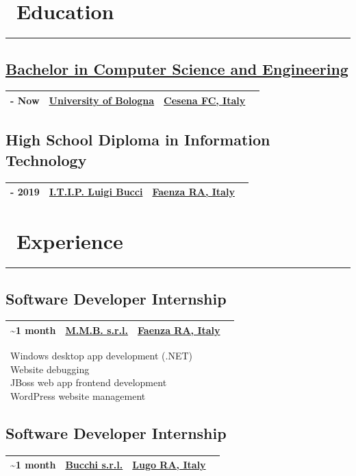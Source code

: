 \documentclass{article}
\newcommand{\event}[3]{
    \begin{tabularx}{\linewidth}{| >{\raggedright\arraybackslash}X >{\centering\arraybackslash}X >{\raggedleft\arraybackslash}X |}
        \hline
        #1 & #2 & #3 \\
        \hline
    \end{tabularx}
    \vspace{-10pt}
}
\let\oldsection\section
\renewcommand{\section}[1]{
    \oldsection*{#1}
    \vspace{-20pt}
    \rule{\linewidth}{2pt}
    \vspace{-30pt}
}
\let\oldsubsection\subsection
\renewcommand{\subsection}[1]{
    \oldsubsection*{#1}
    \vspace{-5pt}
}
\begin{document}
\setlength{\columnsep}{70pt}
\begin{paracol}{2}
    \section{\faGraduationCap \ Education}

    \subsection{\href{https://corsi.unibo.it/1cycle/ComputerScienceEngineering}{Bachelor in Computer Science and Engineering}}
    \event
        {\faCalendar* 2019 - Now}
        {\href{https://www.unibo.it/en/}{University of Bologna}}
        {\href{https://www.openstreetmap.org/relation/42809}{Cesena FC, Italy} \ \faCity}

    \subsection{High School Diploma in Information Technology}
    \event
        {\faCalendar* 2014 - 2019}
        {\href{https://www.itipfaenza.edu.it/}{I.T.I.P. Luigi Bucci}}
        {\href{https://www.openstreetmap.org/relation/43004}{Faenza RA, Italy} \ \faCity}


    \section{\faBriefcase \ Experience}

    \subsection{Software Developer Internship}
    \event
        {\faCalendar* 2018 \textasciitilde 1 month}
        {\href{https://www.mmbsoftware.it/portalemmb/en/home}{M.M.B. s.r.l.}}
        {\href{https://www.openstreetmap.org/relation/43004}{Faenza RA, Italy} \ \faCity}
    
    \noindent
    \faDesktop \ Windows desktop app development (.NET) \\
    \faBug \ Website debugging \\
    \faCoffee \ JBoss web app frontend development \\
    \faWordpress \ WordPress website management

    \subsection{Software Developer Internship}
    \event
        {\faCalendar* 2018 \textasciitilde 1 month}
        {\href{http://www.bucchi.it/en/}{Bucchi s.r.l.}}
        {\href{https://www.openstreetmap.org/relation/43140}{Lugo RA, Italy} \ \faCity}


\end{paracol}
\end{document}
